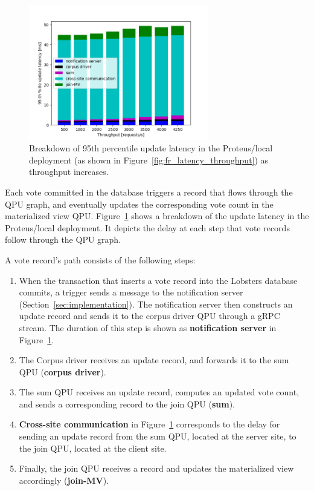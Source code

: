 \begin{figure}[H]
\centering
  \includegraphics[width=0.7\textwidth]{./figures/evaluation/fr_latency_throughput_breakdown.png}
  \caption{Breakdown of 95th percentile update latency in the Proteus/local deployment
  (as shown in Figure~\ref{fig:fr_latency_throughput}) as throughput increases.}
  \label{fig:fr_latency_throughput_breakdown}
\end{figure}

Each vote committed in the database triggers a record that flows through the QPU graph, and eventually updates the corresponding
vote count in the materialized view QPU.
Figure~\ref{fig:fr_latency_throughput_breakdown} shows a breakdown of the update latency in the Proteus/local
deployment.
It depicts the delay at each step that vote records follow through the QPU graph.

A vote record's path consists of the following steps:
\begin{enumerate}
  \item When the transaction that inserts a vote record into the Lobsters database commits,
  a trigger sends a message to the notification server (Section~\ref{sec:implementation}).
  The notification server then constructs an update record and sends it to the corpus driver QPU through a gRPC stream.
  The duration of this step is shown as \textbf{notification server} in Figure~\ref{fig:fr_latency_throughput_breakdown}.

  \item The Corpus driver receives an update record, and forwards it to the sum QPU (\textbf{corpus driver}).

  \item The sum QPU receives an update record, computes an updated vote count,
  and sends a corresponding record to the join QPU (\textbf{sum}).

  \item \textbf{Cross-site communication} in Figure~\ref{fig:fr_latency_throughput_breakdown} corresponds to the delay for
  sending an update record from the sum QPU, located at the server site, to the join QPU, located at the client site.

  \item Finally, the join QPU receives a record and updates the materialized view accordingly (\textbf{join-MV}).

\end{enumerate}

